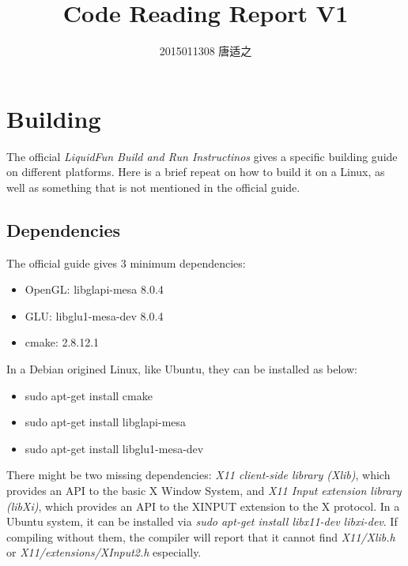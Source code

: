 \documentclass[UTF8]{ctexart}
\title{\huge Code Reading Report V1}
\author{\large 2015011308 唐适之}
\date{}
\begin{document}
    
    \maketitle

    \section{Building}
        
        The official \textit{LiquidFun Build and Run Instructinos} gives a specific building guide on different platforms. Here is a brief repeat on how to build it on a Linux, as well as something that is not mentioned in the official guide.

        \subsection{Dependencies}

            The official guide gives 3 minimum dependencies:
            
            \begin{itemize}
                \item OpenGL: libglapi-mesa 8.0.4
                \item GLU: libglu1-mesa-dev 8.0.4
                \item cmake: 2.8.12.1
            \end{itemize}

            In a Debian origined Linux, like Ubuntu, they can be installed as below:

            \begin{itemize}
                \item sudo apt-get install cmake
                \item sudo apt-get install libglapi-mesa
                \item sudo apt-get install libglu1-mesa-dev
            \end{itemize}

            There might be two missing dependencies: \textit{X11 client-side library (Xlib)}, which provides an API to the basic X Window System, and \textit{X11 Input extension library (libXi)}, which provides an API to the XINPUT extension to the X protocol. In a Ubuntu system, it can be installed via \textit{sudo apt-get install libx11-dev libxi-dev}. If compiling without them, the compiler will report that it cannot find \textit{X11/Xlib.h} or \textit{X11/extensions/XInput2.h} especially.
\end{document}
